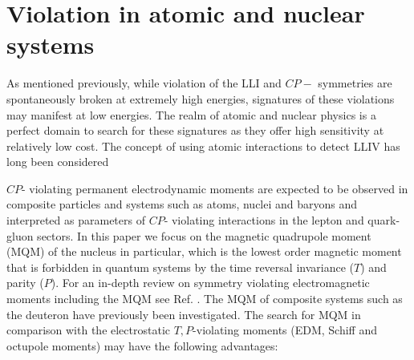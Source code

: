 \documentclass[8pt,a4paper, twoside]{report}
\begin{document}
\section{Violation in atomic and nuclear systems}
As mentioned previously, while violation of the LLI and $CP-$ symmetries are spontaneously broken at extremely high energies, signatures of these violations may manifest at low energies. The realm of atomic and nuclear physics is a perfect domain to search for these signatures as they offer high sensitivity at relatively low cost. The concept of using atomic interactions to detect LLIV has long been considered \cite{Hughes1960, Drever1961, Prestage1985, Lamoreaux1986, Lamoreaux1989}





$CP$- violating permanent electrodynamic moments are expected to be observed in composite particles and systems  such as atoms, nuclei and baryons and interpreted as parameters of $CP$- violating interactions in the lepton and quark-gluon sectors. In this paper we focus on the magnetic quadrupole moment (MQM) of the nucleus in particular, which is the lowest order magnetic moment that is forbidden in quantum systems by the time reversal invariance ($T$) and  parity ($P$).  For an in-depth review on symmetry violating electromagnetic moments including the MQM see Ref. \cite{GF2004, KhriplovichPNC, SFK1984, Roberts2015, KhriplovichCP, Pospelov2005}. The MQM of composite systems such as the deuteron \cite{Liu2012} have previously been investigated. The search for MQM in comparison with the electrostatic $T,P$-violating moments (EDM, Schiff and octupole moments) may have the following advantages:
\end{document}
